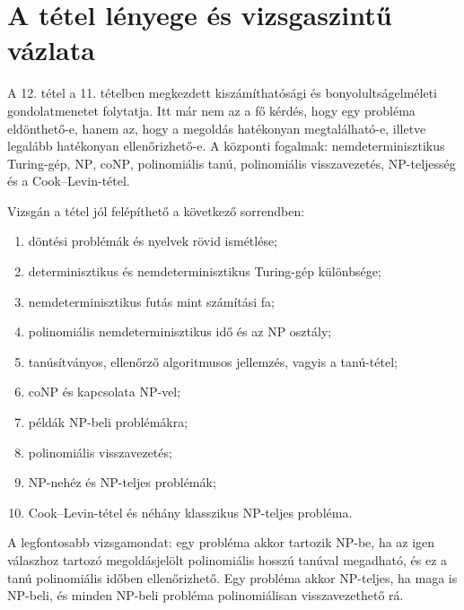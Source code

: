 \section{A tétel lényege és vizsgaszintű vázlata}

\begin{summarybox}
A 12. tétel a 11. tételben megkezdett kiszámíthatósági és bonyolultságelméleti gondolatmenetet folytatja. Itt már nem az a fő kérdés, hogy egy probléma eldönthető-e, hanem az, hogy a megoldás hatékonyan megtalálható-e, illetve legalább hatékonyan ellenőrizhető-e. A központi fogalmak: nemdeterminisztikus Turing-gép, $\mathrm{NP}$, $\mathrm{coNP}$, polinomiális tanú, polinomiális visszavezetés, NP-teljesség és a Cook--Levin-tétel.
\end{summarybox}

Vizsgán a tétel jól felépíthető a következő sorrendben:

\begin{enumerate}
  \item döntési problémák és nyelvek rövid ismétlése;
  \item determinisztikus és nemdeterminisztikus Turing-gép különbsége;
  \item nemdeterminisztikus futás mint számítási fa;
  \item polinomiális nemdeterminisztikus idő és az $\mathrm{NP}$ osztály;
  \item tanúsítványos, ellenőrző algoritmusos jellemzés, vagyis a tanú-tétel;
  \item $\mathrm{coNP}$ és kapcsolata $\mathrm{NP}$-vel;
  \item példák $\mathrm{NP}$-beli problémákra;
  \item polinomiális visszavezetés;
  \item NP-nehéz és NP-teljes problémák;
  \item Cook--Levin-tétel és néhány klasszikus NP-teljes probléma.
\end{enumerate}

A legfontosabb vizsgamondat: egy probléma akkor tartozik $\mathrm{NP}$-be, ha az igen válaszhoz tartozó megoldásjelölt polinomiális hosszú tanúval megadható, és ez a tanú polinomiális időben ellenőrizhető. Egy probléma akkor NP-teljes, ha maga is $\mathrm{NP}$-beli, és minden $\mathrm{NP}$-beli probléma polinomiálisan visszavezethető rá.

\begin{center}

\end{center}

